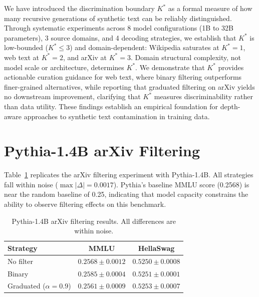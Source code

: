\documentclass[11pt,a4paper]{article}
\begin{document}
We have introduced the discrimination boundary $K^*$ as a formal measure of how many recursive generations of synthetic text can be reliably distinguished. Through systematic experiments across 8 model configurations (1B to 32B parameters), 3 source domains, and 4 decoding strategies, we establish that $K^*$ is low-bounded ($K^* \le 3$) and domain-dependent: Wikipedia saturates at $K^*\!=\!1$, web text at $K^*\!=\!2$, and arXiv at $K^*\!=\!3$. Domain structural complexity, not model scale or architecture, determines $K^*$. We demonstrate that $K^*$ provides actionable curation guidance for web text, where binary filtering outperforms finer-grained alternatives, while reporting that graduated filtering on arXiv yields no downstream improvement, clarifying that $K^*$ measures discriminability rather than data utility. These findings establish an empirical foundation for depth-aware approaches to synthetic text contamination in training data.

\appendix

\section{Pythia-1.4B arXiv Filtering}
\label{app:pythia_null}

Table~\ref{tab:pythia_null} replicates the arXiv filtering experiment with Pythia-1.4B. All strategies fall within noise ($\max |\Delta| = 0.0017$). Pythia's baseline MMLU score (0.2568) is near the random baseline of 0.25, indicating that model capacity constrains the ability to observe filtering effects on this benchmark.

\begin{table}[h]
\centering
\small
\caption{Pythia-1.4B arXiv filtering results. All differences are within noise.}
\label{tab:pythia_null}
\begin{tabular}{lcc}
\toprule
\textbf{Strategy} & \textbf{MMLU} & \textbf{HellaSwag} \\
\midrule
No filter            & $0.2568 \pm 0.0012$ & $0.5250 \pm 0.0008$ \\
Binary               & $0.2585 \pm 0.0004$ & $0.5251 \pm 0.0001$ \\
Graduated ($\alpha\!=\!0.9$) & $0.2561 \pm 0.0009$ & $0.5253 \pm 0.0007$ \\
\bottomrule
\end{tabular}
\end{table}
\end{document}
